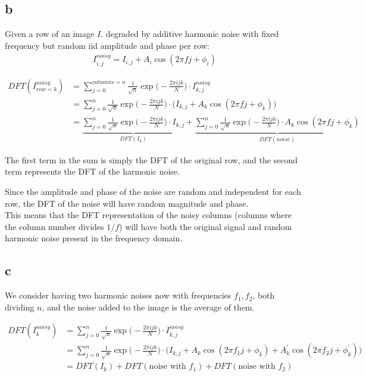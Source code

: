 \documentclass[english]{extarticle}
\numberwithin{equation}{section}
\numberwithin{figure}{section}
\begin{document}
\subsection*{b}

Given a row of an image $I$. degraded by additive harmonic noise with fixed frequency but random iid amplitude and phase per row:
\begin{align*}
    I_{i,j}^{noisy} = I_{i,j} + A_i \cos (2\pi fj+\phi_i)
\end{align*}

\begin{align*}
    DFT(I^{noisy}_{row=k}) & = \sum_{j=0}^{columns=n} \frac{1}{\sqrt{n}} \exp \big( - \frac{2\pi ijk}{N} \big) \cdot I_{k,j}^{noisy} \\
    & = \sum_{j=0}^{n} \frac{1}{\sqrt{n}} \exp \big( - \frac{2\pi ijk}{N} \big) \cdot \big( I_{k,j} + A_k \cos (2\pi fj+\phi_k) \big) \\
    & = \underbrace{\sum_{j=0}^{n} \frac{1}{\sqrt{n}} \exp \big( - \frac{2\pi ijk}{N} \big) \cdot I_{k,j}}_{DFT(I_k)} + \underbrace{\sum_{j=0}^{n} \frac{1}{\sqrt{n}} \exp \big( - \frac{2\pi ijk}{N} \big) \cdot A_k \cos (2\pi fj+\phi_k)}_{DFT(noise)}
\end{align*}

The first term in the sum is simply the DFT of the original row, and the second term represents the DFT of the harmonic noise.

Since the amplitude and phase of the noise are random and independent for each row, the DFT of the noise will have random magnitude and phase. \\
This means that the DFT representation of the noisy columns (columns where the column number divides $1/f$) will have both the original signal and random harmonic noise present in the frequency domain.

\subsection*{c}

We consider having two harmonic noises now with frequencies $f_1 , f_2$, both dividing $n$, and the noise added to the image is the average of them.

\begin{align*}
    DFT(I_k^{noisy}) & = \sum_{j=0}^{n} \frac{1}{\sqrt{n}} \exp \big( - \frac{2\pi ijk}{N} \big) \cdot I_{k,j}^{noisy} \\
    & = \sum_{j=0}^{n} \frac{1}{\sqrt{n}} \exp \big( - \frac{2\pi ijk}{N} \big) \cdot \big( I_{k,j} + A_k \cos (2\pi f_1 j+\phi_k) + A_k^{\prime} \cos (2\pi f_2 j+\phi_k^{\prime}) \big) \\
    & = DFT(I_k) + DFT(\text{noise with }f_1) + DFT(\text{noise with }f_2)
\end{align*}
\end{document}
